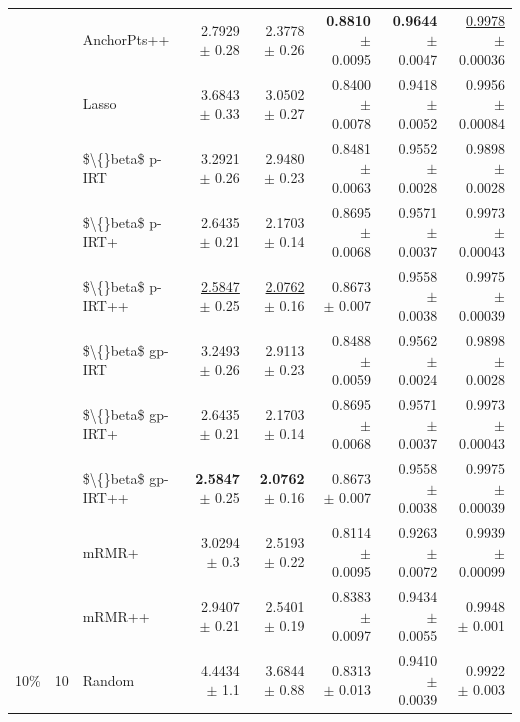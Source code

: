 \begin{longtable}{llp{}rrrrr}
 &  & AnchorPts++ & 2.7929 {\scriptsize $\pm$ 0.28} & 2.3778 {\scriptsize $\pm$ 0.26} & \textbf{0.8810} {\scriptsize $\pm$ 0.0095} & \textbf{0.9644} {\scriptsize $\pm$ 0.0047} & \underline{0.9978} {\scriptsize $\pm$ 0.00036} \\
 &  & Lasso & 3.6843 {\scriptsize $\pm$ 0.33} & 3.0502 {\scriptsize $\pm$ 0.27} & 0.8400 {\scriptsize $\pm$ 0.0078} & 0.9418 {\scriptsize $\pm$ 0.0052} & 0.9956 {\scriptsize $\pm$ 0.00084} \\
 &  & \$\textbackslash\{\}beta\$ p-IRT & 3.2921 {\scriptsize $\pm$ 0.26} & 2.9480 {\scriptsize $\pm$ 0.23} & 0.8481 {\scriptsize $\pm$ 0.0063} & 0.9552 {\scriptsize $\pm$ 0.0028} & 0.9898 {\scriptsize $\pm$ 0.0028} \\
 &  & \$\textbackslash\{\}beta\$ p-IRT+ & 2.6435 {\scriptsize $\pm$ 0.21} & 2.1703 {\scriptsize $\pm$ 0.14} & 0.8695 {\scriptsize $\pm$ 0.0068} & 0.9571 {\scriptsize $\pm$ 0.0037} & 0.9973 {\scriptsize $\pm$ 0.00043} \\
 &  & \$\textbackslash\{\}beta\$ p-IRT++ & \underline{2.5847} {\scriptsize $\pm$ 0.25} & \underline{2.0762} {\scriptsize $\pm$ 0.16} & 0.8673 {\scriptsize $\pm$ 0.007} & 0.9558 {\scriptsize $\pm$ 0.0038} & 0.9975 {\scriptsize $\pm$ 0.00039} \\
 &  & \$\textbackslash\{\}beta\$ gp-IRT & 3.2493 {\scriptsize $\pm$ 0.26} & 2.9113 {\scriptsize $\pm$ 0.23} & 0.8488 {\scriptsize $\pm$ 0.0059} & 0.9562 {\scriptsize $\pm$ 0.0024} & 0.9898 {\scriptsize $\pm$ 0.0028} \\
 &  & \$\textbackslash\{\}beta\$ gp-IRT+ & 2.6435 {\scriptsize $\pm$ 0.21} & 2.1703 {\scriptsize $\pm$ 0.14} & 0.8695 {\scriptsize $\pm$ 0.0068} & 0.9571 {\scriptsize $\pm$ 0.0037} & 0.9973 {\scriptsize $\pm$ 0.00043} \\
 &  & \$\textbackslash\{\}beta\$ gp-IRT++ & \textbf{2.5847} {\scriptsize $\pm$ 0.25} & \textbf{2.0762} {\scriptsize $\pm$ 0.16} & 0.8673 {\scriptsize $\pm$ 0.007} & 0.9558 {\scriptsize $\pm$ 0.0038} & 0.9975 {\scriptsize $\pm$ 0.00039} \\
 &  & mRMR+ & 3.0294 {\scriptsize $\pm$ 0.3} & 2.5193 {\scriptsize $\pm$ 0.22} & 0.8114 {\scriptsize $\pm$ 0.0095} & 0.9263 {\scriptsize $\pm$ 0.0072} & 0.9939 {\scriptsize $\pm$ 0.00099} \\
 &  & mRMR++ & 2.9407 {\scriptsize $\pm$ 0.21} & 2.5401 {\scriptsize $\pm$ 0.19} & 0.8383 {\scriptsize $\pm$ 0.0097} & 0.9434 {\scriptsize $\pm$ 0.0055} & 0.9948 {\scriptsize $\pm$ 0.001} \\
\midrule
10\% & 10 & Random & 4.4434 {\scriptsize $\pm$ 1.1} & 3.6844 {\scriptsize $\pm$ 0.88} & 0.8313 {\scriptsize $\pm$ 0.013} & 0.9410 {\scriptsize $\pm$ 0.0039} & 0.9922 {\scriptsize $\pm$ 0.003} \\

\end{longtable}
